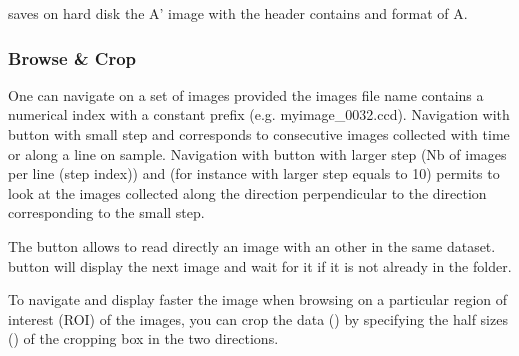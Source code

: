 \documentclass[letterpaper,10pt,english]{sphinxmanual}
\begin{document}
 saves on hard disk the A’ image with the header contains and format of A.
\begin{quote}

\noindent{}
\end{quote}


\subsubsection{Browse \& Crop}
\label{\detokenize{PeakSearchGUI:browse-crop}}
One can navigate on a set of images provided the images file name contains a numerical index with a constant prefix (e.g. myimage\_0032.ccd). Navigation with button with small step  and  corresponds to consecutive images collected with time or along a line on sample.  Navigation with button with larger step (Nb of images per line (step index))  and  (for instance with larger step equals to 10) permits to look at the images collected along the direction perpendicular to the direction corresponding to the small step.

The  button allows to read directly an image with an other in the same dataset.  button will display the next image and wait for it if it is not already in the folder.
\begin{quote}

\noindent{}
\end{quote}

To navigate and display faster the image when browsing on a particular region of interest (ROI) of the images, you can crop the data () by specifying the half sizes () of the cropping box in the two directions.
\begin{quote}

\noindent{}
\end{quote}
\end{document}
